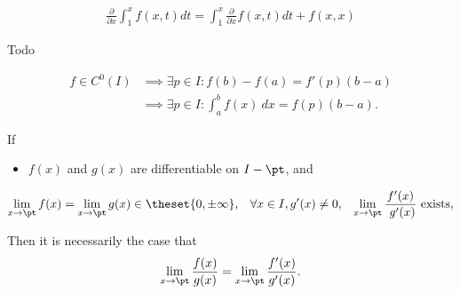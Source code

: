 \begin{corollary}[?]

\begin{align*}
    \frac{\partial}{\partial x} \int_{1}^{x} f(x, t) dt = \int_{1}^{x} \frac{\partial}{\partial x} f(x, t) dt + f(x, x)
\end{align*}

\end{corollary}

\begin{proposition}

Todo

\end{proposition}


\begin{proposition}

\begin{align*}  
f \in C^0(I) &\implies \exists p\in I: f(b) - f(a) = f'(p)(b-a) \\
          &\implies \exists p\in I: \int_a^b f(x)~dx = f(p)(b-a)
.\end{align*}

\end{proposition}

\begin{proposition}

\end{proposition}


\begin{proposition}

If

\begin{itemize}
\tightlist
\item
  \(f(x)\) and \(g(x)\) are differentiable on \(I - \pt\), and
\end{itemize}

\begin{align*}
  \lim_{x\to \pt} f(x) = \lim_{x\to \pt} g(x) \in \theset{0, \pm \infty}, &&
  \forall x \in I, g'(x) \neq 0, && 
  \lim_{x\to\pt} \frac{ f'(x)}{\ g'(x)} \text{ exists}, \\
\end{align*}

Then it is necessarily the case that
\begin{align*}
\lim _ { x \rightarrow \pt } \frac { f ( x ) } { g ( x ) } 
= \lim _ { x \rightarrow \pt } \frac { f ^ { \prime } ( x ) } { g ^ { \prime } ( x ) }.
\end{align*}

\end{proposition}

